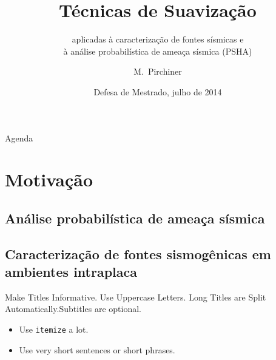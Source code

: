 \documentclass[ucs,8pt]{beamer}
\title[Smoothing Techniques] %
{Técnicas de Suavização}
\subtitle
{aplicadas à caracterização de fontes sísmicas e \\ 
 à análise probabilística de ameaça sísmica (PSHA)}
\author[Pirchiner, Marlon] %
{M.~Pirchiner }
\institute[EMAp-FGV / IAG-USP] %
{EMAp-FGV / Centro de Sismologia - USP}
\date[EMAP2014] %
{Defesa de Mestrado, julho de 2014}
\begin{document}
\begin{frame}[plain]
  \titlepage
\end{frame}

\begin{frame}{Agenda}
  \tableofcontents
\end{frame}



\section{Motivação}
	\subsection{Análise probabilística de ameaça sísmica}
	\subsection{Caracterização de fontes sismogênicas em ambientes intraplaca}



\begin{frame}{Make Titles Informative. Use Uppercase Letters. Long Titles are Split Automatically.}{Subtitles are optional.}
  \begin{itemize}
  \item
    Use \texttt{itemize} a lot.
  \item
    Use very short sentences or short phrases.
  \end{itemize}
\end{frame}
\end{document}

